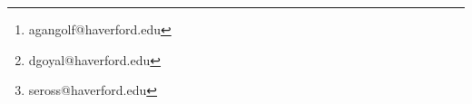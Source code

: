 \newenvironment{note}[1]{\begin{tcolorbox}[
    arc=0mm,
    colback=white,
    colframe=white!60!black,
    title=#1,
    fonttitle=\sffamily,
    breakable
]}{\end{tcolorbox}}




\usepackage{import}
\usepackage{pdfpages}
\usepackage{transparent}



\usepackage[normalem]{ulem}
\useunder{\uline}{\ul}{}

\usepackage{framed}
\usepackage[page]{appendix}
\usepackage{authblk}

\newcommand{\incfig}[1]{%
  \def\svgwidth{\columnwidth}
  {#1.pdf_tex}
}
\usepackage{pgfplots}
\pgfplotsset{width=7cm,compat=1.18}
\usepackage[section]{placeins}
\captionsetup{subrefformat=parens}

\usepackage{longtable}
\usepackage{array}

\usepackage[backend=biber,style=apa]{biblatex}


\usepackage{lipsum, verbatim}
\usepackage{hyperref}
\usepackage{bookmark}


\author[1]{Annais Gangolf\thanks{agangolf@haverford.edu}}
\author[1]{Devansh Goyal\thanks{dgoyal@haverford.edu}}
\author[1]{Samuel E. Ross\thanks{seross@haverford.edu}}
\date{\today}
\setcounter{Maxaffil}{0}
\renewcommand\Affilfont{\itshape\small}


